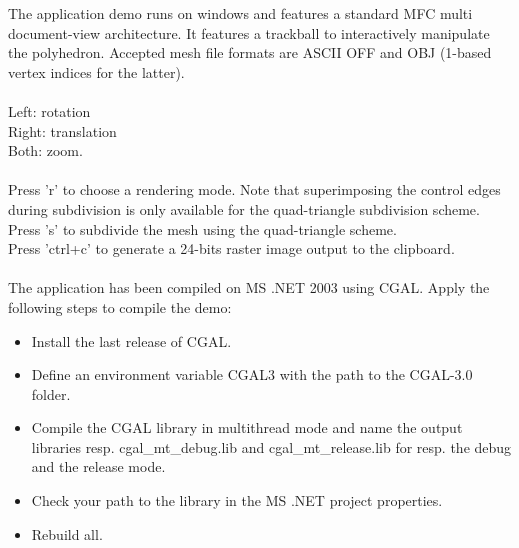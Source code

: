 The application demo runs on windows and features a standard MFC multi
document-view architecture. It features a trackball to interactively
manipulate the polyhedron. Accepted mesh file formats are ASCII OFF
and OBJ (1-based vertex indices for the latter). \\

\\
Left: rotation\\
Right: translation\\
Both: zoom.\\

\\
Press 'r' to choose a rendering mode. Note that superimposing the
control edges during subdivision is only available for the
quad-triangle subdivision scheme.\\
Press 's' to subdivide the mesh using the quad-triangle scheme.\\
Press 'ctrl+c' to generate a 24-bits raster image output to the clipboard.\\

\\
The application has been compiled on MS .NET 2003 using CGAL. Apply
the following steps to compile the demo:
\begin{itemize}
\item Install the last release of CGAL.
\item Define an environment variable CGAL3 with the path to the CGAL-3.0 folder.
\item Compile the CGAL library in multithread mode and name the output 
      libraries resp. cgal\_mt\_debug.lib and cgal\_mt\_release.lib 
      for resp. the debug and the release mode.
\item Check your path to the library in the MS .NET project
      properties.
\item Rebuild all.
\end{itemize}
